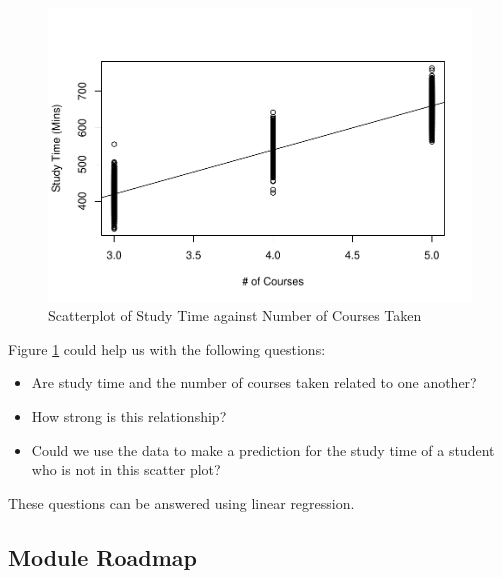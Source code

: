 \documentclass[
]{book}
\newenvironment{Shaded}{\begin{snugshade}}{\end{snugshade}}
\newcommand{\AttributeTok}[1]{\textcolor[rgb]{0.13,0.29,0.53}{#1}}
\newcommand{\DocumentationTok}[1]{\textcolor[rgb]{0.56,0.35,0.01}{\textbf{\textit{#1}}}}
\newcommand{\FunctionTok}[1]{\textcolor[rgb]{0.13,0.29,0.53}{\textbf{#1}}}
\newcommand{\NormalTok}[1]{#1}
\newcommand{\SpecialCharTok}[1]{\textcolor[rgb]{0.81,0.36,0.00}{\textbf{#1}}}
\newcommand{\StringTok}[1]{\textcolor[rgb]{0.31,0.60,0.02}{#1}}
\providecommand{\tightlist}{%
  \setlength{\itemsep}{0pt}\setlength{\parskip}{0pt}}
\begin{document}
\begin{Shaded}
\end{Shaded}

\begin{figure}
\centering
\includegraphics{bookdown-demo_files/figure-latex/10-scatter-1.pdf}
\caption{\label{fig:10-scatter}Scatterplot of Study Time against Number of Courses Taken}
\end{figure}

Figure \ref{fig:10-scatter} could help us with the following questions:

\begin{itemize}
\tightlist
\item
  Are study time and the number of courses taken related to one another?
\item
  How strong is this relationship?
\item
  Could we use the data to make a prediction for the study time of a student who is not in this scatter plot?
\end{itemize}

These questions can be answered using linear regression.

\hypertarget{module-roadmap-8}{%
\subsection{Module Roadmap}\label{module-roadmap-8}}
\end{document}
